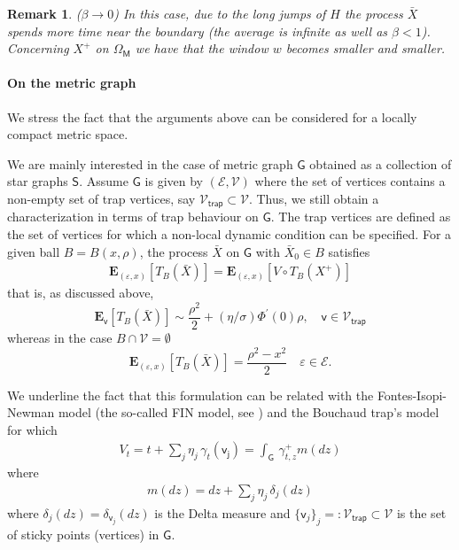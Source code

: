 \documentclass[[11pt,a4paper,reqno]{article}
\newtheorem{remark}{Remark}[section]
\numberwithin{equation}{section}
\begin{document}
\begin{remark}
    ($\beta \to 0$) In this case, due to the long jumps of $H$ the process $\bar{X}$ spends more time near the boundary (the average is infinite as well as $\beta < 1$). Concerning $X^+$ on $\Omega_\mathsf{M}$ we have that the window $w$ becomes smaller and smaller.  
\end{remark}








\paragraph{On the metric graph}






We stress the fact that the arguments above can be considered for a locally compact metric space.

 We are mainly interested in the case of metric graph $\mathsf{G}$  obtained as a collection of star graphs $\mathsf{S}$. Assume $\mathsf{G}$ is given by $(\mathcal{E}, \mathcal{V})$ where the set of vertices contains a non-empty set of trap vertices, say $\mathcal{V_\mathsf{trap}} \subset \mathcal{V}$. Thus, we still obtain a characterization in terms of trap behaviour on $\mathsf{G}$.  The trap vertices are defined as the set of vertices for which a non-local dynamic condition can be specified. For a given ball $B=B(x, \rho)$, the process $\bar{X}$ on $\mathsf{G}$ with $\bar{X}_0\in B$ satisfies 
\begin{align*}
\mathbf{E}_{(\varepsilon, x)}[T_B(\bar{X})] = \mathbf{E}_{(\varepsilon, x)}[V \circ T_B(X^+)] 
\end{align*}
that is, as discussed above, 
\begin{equation}
\mathbf{E}_\mathsf{v}[T_B(\bar{X})] \sim \frac{\rho^2}2 + (\eta/\sigma) \Phi^\prime(0)\rho  , \quad \mathsf{v}\in  \mathcal{V}_\mathsf{trap}\end{equation}
whereas in the case   $ B \cap \mathcal{V} = \emptyset$
\begin{equation}
\mathbf{E}_{(\varepsilon, x)}[T_B(\bar{X})] =\frac{\rho^2-x^2}2 \quad \varepsilon\in \mathcal{E}.\end{equation}


We underline the fact that this formulation can be related with the Fontes-Isopi-Newman model (the so-called FIN  model, see  \cite{FIN})  and the Bouchaud trap's model for which
\begin{align}
    V_t = t + \sum_j \eta_j\, \gamma_t(\mathsf{v_j}) = \int_{\mathsf{G}}\, \gamma^+_{t,z} m(dz) 
\end{align}
where
\begin{align}
    m(dz) = dz + \sum_j \eta_j \, \delta_j(dz) 
\end{align}
where $\delta_j(dz) = \delta_{\mathsf{v}_j}(dz)$ is the Delta measure and $\{\mathsf{v}_j\}_j = :\mathcal{V}_\mathsf{trap} \subset \mathcal{V}$ is the set of sticky points (vertices) in $\mathsf{G}$.
\end{document}
